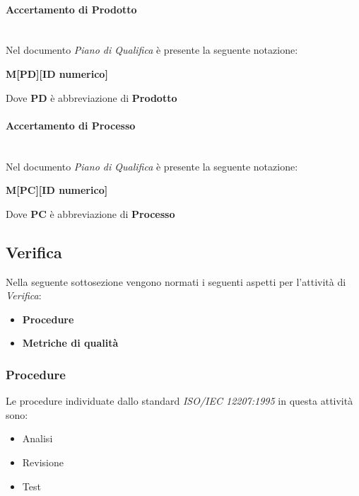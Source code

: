 \paragraph{Accertamento di Prodotto}
\mbox{}\\
Nel documento \textit{Piano di Qualifica} è presente la seguente notazione:
\begin{center}
    \textbf{M[PD][ID numerico]}
\end{center}
Dove \textbf{PD} è abbreviazione di \textbf{Prodotto}

\paragraph{Accertamento di Processo}
\mbox{}\\
Nel documento \textit{Piano di Qualifica} è presente la seguente notazione:
\begin{center}
    \textbf{M[PC][ID numerico]}
\end{center}
Dove \textbf{PC} è abbreviazione di \textbf{Processo}


\subsection{Verifica}
\label{sec:Verifica}
Nella seguente sottosezione vengono normati i seguenti aspetti per l'attività di \textit{Verifica}:
\begin{itemize}
    \item \textbf{Procedure}
    \item \textbf{Metriche di qualità}
\end{itemize}

\subsubsection{Procedure}
Le procedure individuate dallo standard \textit{ISO/IEC 12207:1995} in questa attività sono:
\begin{itemize}
    \item Analisi
    \item Revisione
    \item Test
\end{itemize}

